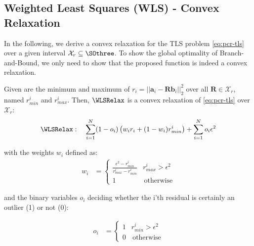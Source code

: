 \subsection{Weighted Least Squares (WLS) - Convex Relaxation}
In the following, we derive a convex relaxation for the TLS problem \ref{eq:pcr-tls} over a given interval $\mathcal{X}_r \subseteq \SOthree$. To show the global optimality of Branch-and-Bound, we only need to show that the proposed function is indeed a convex relaxation.

\begin{theorem}
	\label{thm:wls-relax}
	Given are the minimum and maximum of $r_i = ||\mathbf{a}_i - \mathbf{R} \mathbf{b}_i||_2^2$ over all $\mathbf{R} \in \mathcal{X}_r$, named  $r_{min}^i$ and $r_{max}^i$. Then, $\text{\WLSRelax}$ is a convex  relaxation of \ref{eq:pcr-tls} over $\mathcal{X}_r$:
	\begin{equation}
		\label{eq:tls-wls-relaxation}
		\begin{aligned}	
			\mathrm{\WLSRelax}:\quad
			\sum_{i=1}^{N} (1 - o_i) \left(w_i r_i  + (1 - w_i) r_{min}^i \right) + \sum_{i=1}^{N} o_i\epsilon^2\\
		\end{aligned}
	\end{equation}
	
	with the weights $w_i$ defined as:
	\begin{equation}
		\begin{aligned}	
			w_i  &= 
			\begin{cases}
				\frac{\epsilon^2 - r_{min}^i}{r_{max}^i - r_{min}^i} &  r_{max}^i > \epsilon^2\\
				1 & \, \text{otherwise}
			\end{cases}
		\end{aligned}
	\end{equation}
	
	and the binary variables $o_i$ deciding whether the i'th residual is certainly an outlier (1) or not (0):
	
	\begin{equation}
		\begin{aligned}	
			o_i &= \begin{cases}
				1 &  r_{min}^i > \epsilon^2\\
				0 & \, \text{otherwise}
			\end{cases}
		\end{aligned}
	\end{equation}
	
\end{theorem}

